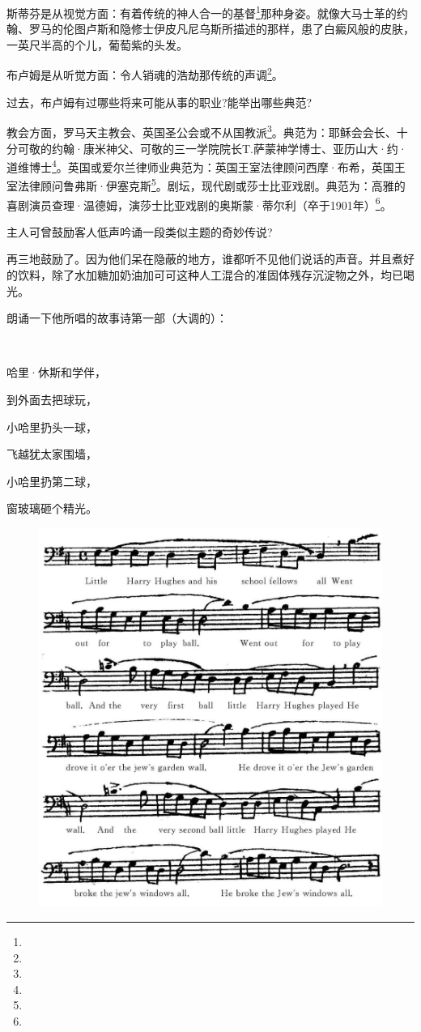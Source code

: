 \par 斯蒂芬是从视觉方面：有着传统的神人合一的基督\footnote{}那种身姿。就像大马士革的约翰、罗马的伦图卢斯和隐修士伊皮凡尼乌斯所描述的那样，患了白癜风般的皮肤，一英尺半高的个儿，葡萄紫的头发。
\par 布卢姆是从听觉方面：令人销魂的浩劫那传统的声调\footnote{}。
\par 过去，布卢姆有过哪些将来可能从事的职业?能举出哪些典范?
\par 教会方面，罗马天主教会、英国圣公会或不从国教派\footnote{}。典范为：耶稣会会长、十分可敬的约翰·康米神父、可敬的三一学院院长T.萨蒙神学博士、亚历山大·约·道维博士\footnote{}。英国或爱尔兰律师业典范为：英国王室法律顾问西摩·布希，英国王室法律顾问鲁弗斯·伊塞克斯\footnote{}。剧坛，现代剧或莎士比亚戏剧。典范为：高雅的喜剧演员查理·温德姆，演莎士比亚戏剧的奥斯蒙·蒂尔利（卒于1901年）\footnote{}。
\par 主人可曾鼓励客人低声吟诵一段类似主题的奇妙传说?
\par 再三地鼓励了。因为他们呆在隐蔽的地方，谁都听不见他们说话的声音。并且煮好的饮料，除了水加糖加奶油加可可这种人工混合的准固体残存沉淀物之外，均已喝光。
\par 朗诵一下他所唱的故事诗第一部（大调的）：
\par  
\par 哈里·休斯和学伴，
\par 到外面去把球玩，
\par 小哈里扔头一球，
\par 飞越犹太家围墙，
\par 小哈里扔第二球，
\par 窗玻璃砸个精光。

\begin{figure}[htb]
    \centering
    \includegraphics[scale=0.3]{picture/尤利西斯2.jpeg}
\end{figure}

